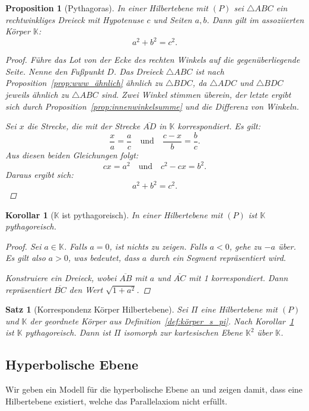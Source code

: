 \documentclass[a4paper,12pt]{article}
\theoremstyle{break}
\newtheorem{theorem}[definition]{Satz}
\newtheorem{proposition}[definition]{Proposition}
\newtheorem{corollary}[definition]{Korollar}
\begin{document}
\begin{proposition}[Pythagoras]
In einer Hilbertebene mit \((P)\) sei \(\triangle ABC\) ein rechtwinkliges Dreieck mit Hypotenuse \(c\) und Seiten \(a, b\). Dann gilt im assoziierten Körper \(\mathbb{K}\):
\[
a^2 + b^2 = c^2.
\]

\begin{proof}
Führe das Lot von der Ecke des rechten Winkels auf die gegenüberliegende Seite. Nenne den Fußpunkt \(D\). Das Dreieck \(\triangle ABC\) ist nach Proposition~\ref{prop:www_ähnlich} ähnlich zu \(\triangle BDC\), da \(\triangle ADC\) und \(\triangle BDC\) jeweils ähnlich zu \(\triangle ABC\) sind. Zwei Winkel stimmen überein, der letzte ergibt sich durch Proposition~\ref{prop:innenwinkelsumme} und die Differenz von Winkeln. 

Sei \(x\) die Strecke, die mit der Strecke \(\overline{AD}\) in \(\mathbb{K}\) korrespondiert. Es gilt:
\[
\frac{x}{a} = \frac{a}{c} \quad \text{und} \quad \frac{c-x}{b} = \frac{b}{c}.
\]
Aus diesen beiden Gleichungen folgt:
\[
cx = a^2 \quad \text{und} \quad c^2 - cx = b^2.
\]
Daraus ergibt sich:
\[
a^2 + b^2 = c^2.
\]
\end{proof}
\end{proposition}

\begin{corollary}[\(\mathbb{K}\) ist pythagoreisch]\label{cor:k_pyth}
In einer Hilbertebene mit \((P)\) ist \(\mathbb{K}\) pythagoreisch.
\begin{proof}
Sei \(a \in \mathbb{K}\). Falls \(a = 0\), ist nichts zu zeigen. Falls \(a < 0\), gehe zu \(-a\) über. Es gilt also \(a > 0\), was bedeutet, dass \(a\) durch ein Segment repräsentiert wird.

Konstruiere ein Dreieck, wobei \(\overline{AB}\) mit \(a\) und \(\overline{AC}\) mit 1 korrespondiert. Dann repräsentiert \(\overline{BC}\) den Wert \(\sqrt{1 + a^2}\).
\end{proof}
\end{corollary}

\begin{theorem}[Korrespondenz Körper Hilbertebene]
Sei \(\Pi\) eine Hilbertebene mit \((P)\) und \(\mathbb{K}\) der geordnete Körper aus Definition~\ref{def:körper_s_pi}. Nach Korollar~\ref{cor:k_pyth} ist \(\mathbb{K}\) pythagoreisch. Dann ist \(\Pi\) isomorph zur kartesischen Ebene \(\mathbb{K}^2\) über \(\mathbb{K}\).
\end{theorem}

\subsection{Hyperbolische Ebene}
Wir geben ein Modell für die hyperbolische Ebene an und zeigen damit, dass eine Hilbertebene existiert, welche das Parallelaxiom nicht erfüllt.
\end{document}

